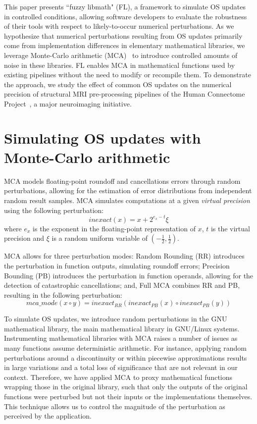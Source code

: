This paper presents ``fuzzy libmath" (FL), a framework to simulate OS updates in controlled conditions,
allowing software developers to evaluate the robustness of their tools with
respect to likely-to-occur numerical perturbations. As we hypothesize that
numerical perturbations resulting from OS updates primarily come from
implementation differences in elementary mathematical
libraries, we leverage Monte-Carlo arithmetic (MCA)~\cite{Parker1997-qq} to introduce
controlled amounts of noise in these libraries. FL
enables MCA in mathematical functions used by existing pipelines without the need to modify or recompile them.
To demonstrate the approach, we study the effect of
common OS updates on the numerical precision of structural MRI pre-processing
pipelines of the Human Connectome Project~\cite{van2013wu}, a major neuroimaging
initiative.

\section{Simulating OS updates with Monte-Carlo arithmetic}
\label{sec:MCA}

MCA models floating-point roundoff and cancellations errors through random
perturbations, allowing for the estimation of error distributions from
independent random result samples. MCA simulates computations at a given
\emph{virtual precision} using the following perturbation:
\begin{equation} \label{eq:mca_inexact}
  inexact(x) = x + 2^{e_x-t}\xi
\end{equation}
where $e_x$ is the exponent in the floating-point representation of $x$,
$t$ is the virtual precision and $\xi$ is a random uniform variable of
$(-\frac{1}{2}, \frac{1}{2})$.

MCA allows for three perturbation modes: Random Rounding (RR) introduces the
perturbation in function outputs, simulating roundoff errors; Precision Bounding
(PB) introduces the perturbation in function operands, allowing for the
detection of catastrophic cancellations; and, Full MCA combines RR and PB,
resulting in the following perturbation:
\begin{equation} \label{eq:mca_modes}
  mca\_mode(x \circ y) = inexact_{RR}(  inexact_{PB}(x) \circ inexact_{PB}(y) )
\end{equation}

To simulate OS updates, we introduce random perturbations in the GNU
mathematical library, the main mathematical library in GNU/Linux systems.
Instrumenting mathematical libraries with MCA raises a number of issues as
many functions assume deterministic arithmetic. For instance, applying random
perturbations around a discontinuity or within piecewise approximations
results in large variations and a total loss of significance that are not
relevant in our context. Therefore, we have applied MCA to proxy
mathematical functions wrapping those in the original library, such that only
the outputs of the original functions were perturbed but not their inputs or
the implementations themselves. This technique allows us to control the
magnitude of the perturbation as perceived by the application.

